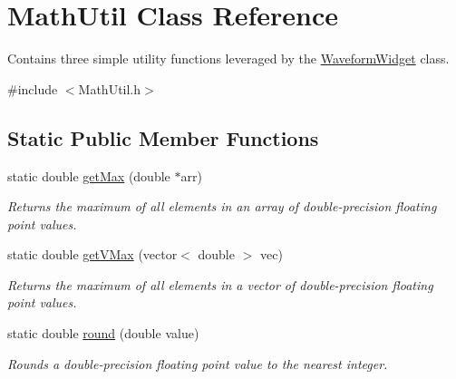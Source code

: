 \hypertarget{classMathUtil}{
\section{MathUtil Class Reference}
\label{classMathUtil}
}


Contains three simple utility functions leveraged by the \hyperlink{classWaveformWidget}{WaveformWidget} class.  


{\ttfamily \#include $<$MathUtil.h$>$}\subsection*{Static Public Member Functions}
\begin{DoxyCompactItemize}
\item 
\hypertarget{classMathUtil_a978de2a6cd9e95ad9f8fde6305622ce8}{
static double \hyperlink{classMathUtil_a978de2a6cd9e95ad9f8fde6305622ce8}{getMax} (double $\ast$arr)}
\label{classMathUtil_a978de2a6cd9e95ad9f8fde6305622ce8}

\begin{DoxyCompactList}\small\item\em Returns the maximum of all elements in an array of double-\/precision floating point values. \item\end{DoxyCompactList}\item 
\hypertarget{classMathUtil_a9d15b3e5e7a2454341d16c00fb023da9}{
static double \hyperlink{classMathUtil_a9d15b3e5e7a2454341d16c00fb023da9}{getVMax} (vector$<$ double $>$ vec)}
\label{classMathUtil_a9d15b3e5e7a2454341d16c00fb023da9}

\begin{DoxyCompactList}\small\item\em Returns the maximum of all elements in a vector of double-\/precision floating point values. \item\end{DoxyCompactList}\item 
\hypertarget{classMathUtil_ad8f16c3f7d031b932747135d84c73eff}{
static double \hyperlink{classMathUtil_ad8f16c3f7d031b932747135d84c73eff}{round} (double value)}
\label{classMathUtil_ad8f16c3f7d031b932747135d84c73eff}

\begin{DoxyCompactList}\small\item\em Rounds a double-\/precision floating point value to the nearest integer. \item\end{DoxyCompactList}\end{DoxyCompactItemize}



